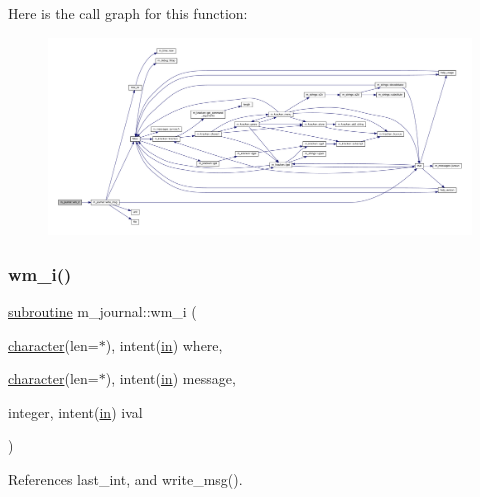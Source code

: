 Here is the call graph for this function\+:
\nopagebreak
\begin{figure}[H]
\begin{center}
\leavevmode
\includegraphics[width=350pt]{namespacem__journal_ae4e688044197dd70bd47b4d7c0bb7306_cgraph}
\end{center}
\end{figure}
\mbox{\label{namespacem__journal_a931487b48fc9268afb0c286c3c3892ad}} 
\subsubsection{\texorpdfstring{wm\+\_\+i()}{wm\_i()}}
{\footnotesize\ttfamily \hyperlink{M__stopwatch_83_8txt_acfbcff50169d691ff02d4a123ed70482}{subroutine} m\+\_\+journal\+::wm\+\_\+i (\begin{DoxyParamCaption}\item[{\hyperlink{option__stopwatch_83_8txt_abd4b21fbbd175834027b5224bfe97e66}{character}(len=$\ast$), intent(\hyperlink{M__journal_83_8txt_afce72651d1eed785a2132bee863b2f38}{in})}]{where,  }\item[{\hyperlink{option__stopwatch_83_8txt_abd4b21fbbd175834027b5224bfe97e66}{character}(len=$\ast$), intent(\hyperlink{M__journal_83_8txt_afce72651d1eed785a2132bee863b2f38}{in})}]{message,  }\item[{integer, intent(\hyperlink{M__journal_83_8txt_afce72651d1eed785a2132bee863b2f38}{in})}]{ival }\end{DoxyParamCaption})\hspace{0.3cm}{\ttfamily [private]}}



References last\+\_\+int, and write\+\_\+msg().

